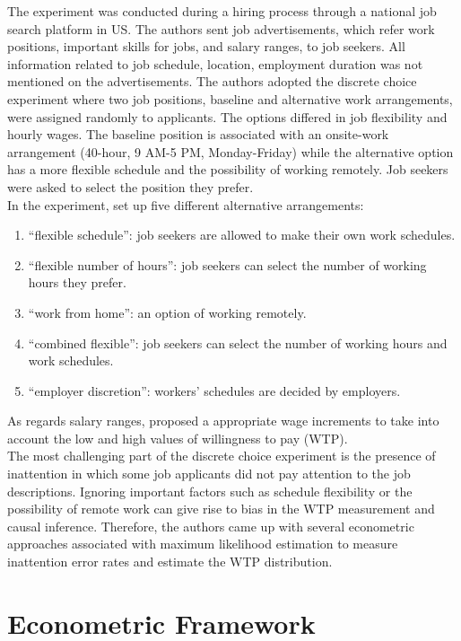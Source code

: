 \documentclass[11pt]{article}
\begin{document}
The experiment was conducted during a hiring process through a national job search platform in US. The authors sent job advertisements, which refer work positions, important skills for jobs, and salary ranges, to job seekers. All information related to job schedule, location, employment duration was not mentioned on the advertisements. The authors adopted the discrete choice experiment where two job positions, baseline and alternative work arrangements, were assigned randomly to applicants. The options differed in job flexibility and hourly wages. The baseline position is associated with an onsite-work arrangement (40-hour, 9 AM-5 PM, Monday-Friday) while the alternative option has a more flexible schedule and the possibility of working remotely. Job seekers were asked to select the position they prefer. \\

In the experiment, \cite{10.1257/aer.20161500} set up five different alternative arrangements:
\begin{enumerate}
    \item ``flexible schedule'': job seekers are allowed to make their own work schedules.
    \item ``flexible number of hours'': job seekers can select the number of working hours they prefer.
    \item ``work from home'': an option of working remotely.
    \item ``combined flexible'': job seekers can select the number of working hours and work schedules.
    \item ``employer discretion'': workers' schedules are decided by employers.
\end{enumerate}

As regards salary ranges, \cite{10.1257/aer.20161500} proposed a appropriate wage increments to take into account the low and high values of willingness to pay (WTP). \\

The most challenging part of the discrete choice experiment is the presence of inattention in which some job applicants did not pay attention to the job descriptions. Ignoring important factors such as schedule flexibility or the possibility of remote work can give rise to bias in the WTP measurement and causal inference. Therefore, the authors came up with several econometric approaches associated with maximum likelihood estimation to measure inattention error rates and estimate the WTP distribution.

\hypertarget{Conceptual and Econometric Framework}{%
\section{Econometric Framework}\label{Conceptual and Econometric Framework}}
\end{document}
